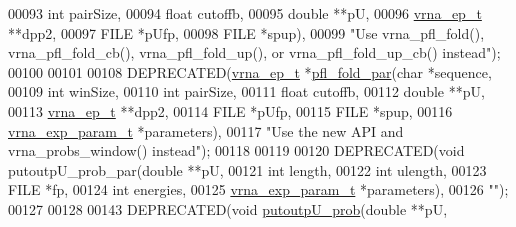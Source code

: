 \begin{DoxyCode}
00093                                \textcolor{keywordtype}{int}           pairSize,
00094                                \textcolor{keywordtype}{float}         cutoffb,
00095                                \textcolor{keywordtype}{double}        **pU,
00096                                \hyperlink{group__struct__utils__plist_structvrna__elem__prob__s}{vrna\_ep\_t}     **dpp2,
00097                                FILE          *pUfp,
00098                                FILE          *spup),
00099 \textcolor{stringliteral}{"Use vrna\_pfl\_fold(), vrna\_pfl\_fold\_cb(), vrna\_pfl\_fold\_up(), or vrna\_pfl\_fold\_up\_cb() instead"});
00100 
00101 
00108 DEPRECATED(\hyperlink{group__struct__utils__plist_structvrna__elem__prob__s}{vrna\_ep\_t} *\hyperlink{group__part__func__window__deprecated_gaedf355f07b3d83bc93f98712132571b0}{pfl\_fold\_par}(\textcolor{keywordtype}{char}              *sequence,
00109                                       \textcolor{keywordtype}{int}               winSize,
00110                                       \textcolor{keywordtype}{int}               pairSize,
00111                                       \textcolor{keywordtype}{float}             cutoffb,
00112                                       \textcolor{keywordtype}{double}            **pU,
00113                                       \hyperlink{group__struct__utils__plist_structvrna__elem__prob__s}{vrna\_ep\_t}         **dpp2,
00114                                       FILE              *pUfp,
00115                                       FILE              *spup,
00116                                       \hyperlink{group__energy__parameters_structvrna__exp__param__s}{vrna\_exp\_param\_t}  *parameters),
00117 \textcolor{stringliteral}{"Use the new API and vrna\_probs\_window() instead"});
00118 
00119 
00120 DEPRECATED(\textcolor{keywordtype}{void} putoutpU\_prob\_par(\textcolor{keywordtype}{double}            **pU,
00121                                   \textcolor{keywordtype}{int}               length,
00122                                   \textcolor{keywordtype}{int}               ulength,
00123                                   FILE              *fp,
00124                                   \textcolor{keywordtype}{int}               energies,
00125                                   \hyperlink{group__energy__parameters_structvrna__exp__param__s}{vrna\_exp\_param\_t}  *parameters),
00126 \textcolor{stringliteral}{""});
00127 
00128 
00143 DEPRECATED(\textcolor{keywordtype}{void}    \hyperlink{group__part__func__window__deprecated_ga0bcb751860bbf34e3dfee8c2fbdb3ef3}{putoutpU\_prob}(\textcolor{keywordtype}{double} **pU,

\end{DoxyCode}
